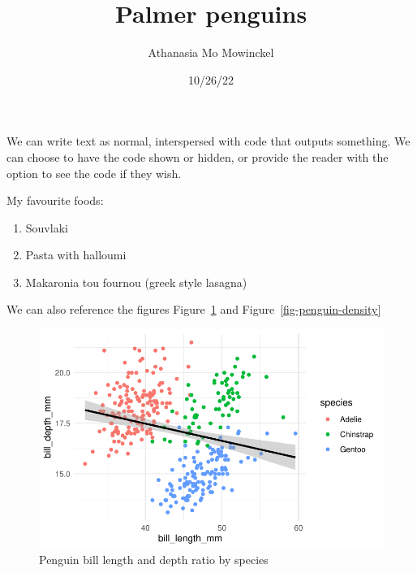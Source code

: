 \documentclass[
  letterpaper,
  DIV=11,
  numbers=noendperiod]{scrartcl}
\title{Palmer penguins}
\author{Athanasia Mo Mowinckel}
\date{10/26/22}
\providecommand{\tightlist}{%
  \setlength{\itemsep}{0pt}\setlength{\parskip}{0pt}}\usepackage{longtable,booktabs,array}
\renewcommand*\contentsname{Table of contents}
\newcommand\contentsname{Table of contents}
\begin{document}
\maketitle
\ifdefined\Shaded\renewenvironment{Shaded}{\begin{tcolorbox}[enhanced, interior hidden, borderline west={3pt}{0pt}{shadecolor}, breakable, sharp corners, frame hidden, boxrule=0pt]}{\end{tcolorbox}}\fi

\renewcommand*\contentsname{Contents}
{
\hypersetup{linkcolor=}
\setcounter{tocdepth}{2}
\tableofcontents
}
\hfill\break
We can write text as normal, interspersed with code that outputs
something. We can choose to have the code shown or hidden, or provide
the reader with the option to see the code if they wish.

My favourite foods:

\begin{enumerate}
\def\labelenumi{\arabic{enumi}.}
\tightlist
\item
  Souvlaki
\item
  Pasta with halloumi
\item
  Makaronia tou fournou (greek style lasagna)
\end{enumerate}

We can also reference the figures Figure~\ref{fig-penguin-smooth} and
Figure~\ref{fig-penguin-density}

\begin{figure}[h]

{\centering \includegraphics{03_pdf_example_files/figure-pdf/fig-penguin-smooth-1.pdf}

}

\caption{\label{fig-penguin-smooth}Penguin bill length and depth ratio
by species}

\end{figure}
\end{document}

